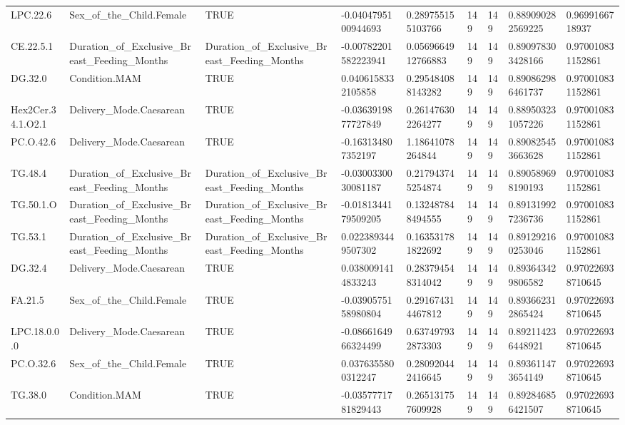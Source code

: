 \begin{longtable}{lllllllll}
LPC.22.6 & Sex\_of\_the\_Child.Female & TRUE & -0.0404795100944693 & 0.289755155103766 & 149 & 149 & 0.889090282569225 & 0.9699166718937 \\
CE.22.5.1 & Duration\_of\_Exclusive\_Breast\_Feeding\_Months & Duration\_of\_Exclusive\_Breast\_Feeding\_Months & -0.00782201582223941 & 0.0569664912766883 & 149 & 149 & 0.890978303428166 & 0.970010831152861 \\
DG.32.0 & Condition.MAM & TRUE & 0.0406158332105858 & 0.295484088143282 & 149 & 149 & 0.890862986461737 & 0.970010831152861 \\
Hex2Cer.34.1.O2.1 & Delivery\_Mode.Caesarean & TRUE & -0.0363919877727849 & 0.261476302264277 & 149 & 149 & 0.889503231057226 & 0.970010831152861 \\
PC.O.42.6 & Delivery\_Mode.Caesarean & TRUE & -0.163134807352197 & 1.18641078264844 & 149 & 149 & 0.890825453663628 & 0.970010831152861 \\
TG.48.4 & Duration\_of\_Exclusive\_Breast\_Feeding\_Months & Duration\_of\_Exclusive\_Breast\_Feeding\_Months & -0.0300330030081187 & 0.217943745254874 & 149 & 149 & 0.890589698190193 & 0.970010831152861 \\
TG.50.1.O & Duration\_of\_Exclusive\_Breast\_Feeding\_Months & Duration\_of\_Exclusive\_Breast\_Feeding\_Months & -0.0181344179509205 & 0.132487848494555 & 149 & 149 & 0.891319927236736 & 0.970010831152861 \\
TG.53.1 & Duration\_of\_Exclusive\_Breast\_Feeding\_Months & Duration\_of\_Exclusive\_Breast\_Feeding\_Months & 0.0223893449507302 & 0.163531781822692 & 149 & 149 & 0.891292160253046 & 0.970010831152861 \\
DG.32.4 & Delivery\_Mode.Caesarean & TRUE & 0.0380091414833243 & 0.283794548314042 & 149 & 149 & 0.893643429806582 & 0.970226938710645 \\
FA.21.5 & Sex\_of\_the\_Child.Female & TRUE & -0.0390575158980804 & 0.291674314467812 & 149 & 149 & 0.893662312865424 & 0.970226938710645 \\
LPC.18.0.0.0 & Delivery\_Mode.Caesarean & TRUE & -0.0866164966324499 & 0.637497932873303 & 149 & 149 & 0.892114236448921 & 0.970226938710645 \\
PC.O.32.6 & Sex\_of\_the\_Child.Female & TRUE & 0.0376355800312247 & 0.280920442416645 & 149 & 149 & 0.893611473654149 & 0.970226938710645 \\
TG.38.0 & Condition.MAM & TRUE & -0.0357771781829443 & 0.265131757609928 & 149 & 149 & 0.892846856421507 & 0.970226938710645 \\

\end{longtable}
